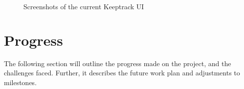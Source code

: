 \documentclass [11pt,a4paper]{article}
\begin{document}
\begin{figure}[H]%
    \centering
    \qquad
    \qquad
    \caption{Screenshots of the current Keeptrack UI}%
    \label{fig:currentUIScreenshots}%
\end{figure}


\section{Progress}
\label{sec:progress}
The following section will outline the progress made on the project, and the challenges faced. Further, it describes the future work plan and adjustments to milestones. 
\end{document}

